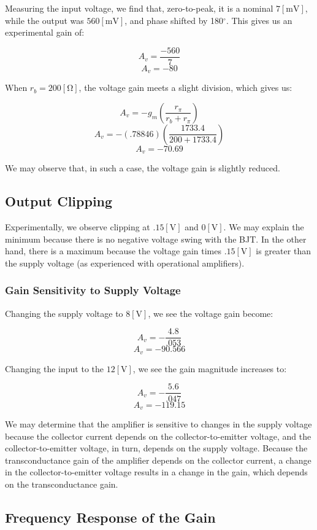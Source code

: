 \documentclass[
	letterpaper, %
	10pt, %
]{CSUniSchoolLabReport}
\begin{document}
Measuring the input voltage, we find that, zero-to-peak, it is a nominal $7[\si{\milli\volt}]$, while the output was $560[\si{\milli\volt}]$, and phase shifted by 180$^{\circ}$. This gives us an experimental gain of:

$$A_v=\frac{-560}{7}$$
$$\boxed{A_v=-80}$$

When $r_b=200[\si{\ohm}]$, the voltage gain meets a slight division, which gives us:

$$A_v=-g_m\left( \frac{r_{\pi}}{r_b+r_{\pi}} \right)$$
$$A_v=-(.78846)\left( \frac{1733.4}{200+1733.4} \right)$$
$$\boxed{A_v=-70.69}$$

We may observe that, in such a case, the voltage gain is slightly reduced.

\subsection{Output Clipping}

Experimentally, we observe clipping at $.15[\si{\volt}]$ and $0[\si{\volt}]$. We may explain the minimum because there is no negative voltage swing with the BJT. In the other hand, there is a maximum because the voltage gain times $.15[\si{\volt}]$ is greater than the supply voltage (as experienced with operational amplifiers).

\subsubsection{Gain Sensitivity to Supply Voltage}

Changing the supply voltage to $8[\si{\volt}]$, we see the voltage gain become:

$$A_v=-\frac{4.8}{.053}$$
$$\boxed{A_v=-90.566}$$

Changing the input to the $12[\si{\volt}]$, we see the gain magnitude increases to:

$$A_v=-\frac{5.6}{.047}$$
$$\boxed{A_v=-119.15}$$

We may determine that the amplifier is sensitive to changes in the supply voltage because the collector current depends on the collector-to-emitter voltage, and the collector-to-emitter voltage, in turn, depends on the supply voltage. Because the transconductance gain of the amplifier depends on the collector current, a change in the collector-to-emitter voltage results in a change in the gain, which depends on the transconductance gain.

\subsection{Frequency Response of the Gain}
\end{document}

